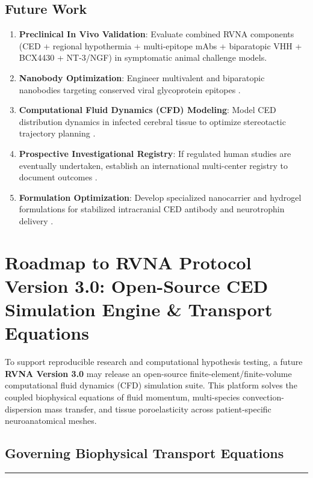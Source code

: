 \documentclass[12pt,a4paper]{article}
\begin{document}
\subsection{Future Work}

\begin{enumerate}
    \item \textbf{Preclinical In Vivo Validation}: Evaluate combined RVNA components (CED + regional hypothermia + multi-epitope mAbs + biparatopic VHH + BCX4430 + NT-3/NGF) in symptomatic animal challenge models.
    \item \textbf{Nanobody Optimization}: Engineer multivalent and biparatopic nanobodies targeting conserved viral glycoprotein epitopes \citep{terryn2016vhh}.
    \item \textbf{Computational Fluid Dynamics (CFD) Modeling}: Model CED distribution dynamics in infected cerebral tissue to optimize stereotactic trajectory planning \citep{parvar2025ced}.
    \item \textbf{Prospective Investigational Registry}: If regulated human studies are eventually undertaken, establish an international multi-center registry to document outcomes \citep{fda2026expanded}.
    \item \textbf{Formulation Optimization}: Develop specialized nanocarrier and hydrogel formulations for stabilized intracranial CED antibody and neurotrophin delivery \citep{parvar2025ced}.
\end{enumerate}

\section{Roadmap to RVNA Protocol Version 3.0: Open-Source CED Simulation Engine \& Transport Equations}

To support reproducible research and computational hypothesis testing, a future \textbf{RVNA Version 3.0} may release an open-source finite-element/finite-volume computational fluid dynamics (CFD) simulation suite. This platform solves the coupled biophysical equations of fluid momentum, multi-species convection-dispersion mass transfer, and tissue poroelasticity across patient-specific neuroanatomical meshes.

\subsection{Governing Biophysical Transport Equations}
\noindent\textcolor{rvnaamber}{\rule{\textwidth}{1.5pt}}
\vspace{-4pt}
\end{document}
